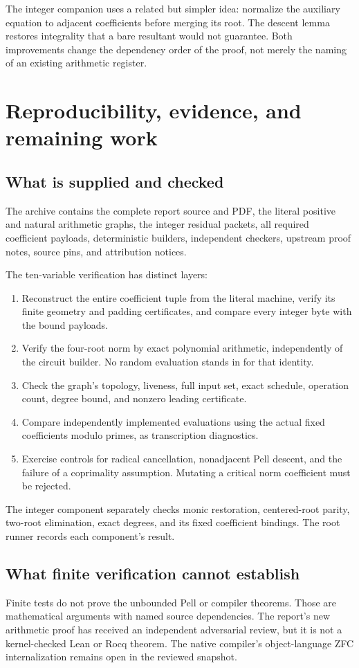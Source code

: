 \documentclass[11pt]{article}
\theoremstyle{remark}
\begin{document}
The integer companion uses a related but simpler idea: normalize the
auxiliary equation to adjacent coefficients before merging its root.
The descent lemma restores integrality that a bare resultant would not
guarantee. Both improvements change the dependency order of the proof,
not merely the naming of an existing arithmetic register.

\section{Reproducibility, evidence, and remaining work}

\subsection{What is supplied and checked}
The archive contains the complete report source and PDF, the literal
positive and natural arithmetic graphs, the integer residual packets,
all required coefficient payloads, deterministic builders, independent
checkers, upstream proof notes, source pins, and attribution notices.

The ten-variable verification has distinct layers:
\begin{enumerate}
\item Reconstruct the entire coefficient tuple from the literal machine,
      verify its finite geometry and padding certificates, and compare every
      integer byte with the bound payloads.
\item Verify the four-root norm by exact polynomial arithmetic, independently
      of the circuit builder. No random evaluation stands in for that identity.
\item Check the graph's topology, liveness, full input set, exact schedule,
      operation count, degree bound, and nonzero leading certificate.
\item Compare independently implemented evaluations using the actual fixed
      coefficients modulo primes, as transcription diagnostics.
\item Exercise controls for radical cancellation, nonadjacent Pell descent,
      and the failure of a coprimality assumption. Mutating a critical norm
      coefficient must be rejected.
\end{enumerate}
The integer component separately checks monic restoration, centered-root
parity, two-root elimination, exact degrees, and its fixed coefficient
bindings. The root runner records each component's result.

\subsection{What finite verification cannot establish}
Finite tests do not prove the unbounded Pell or compiler theorems. Those
are mathematical arguments with named source dependencies. The report's
new arithmetic proof has received an independent adversarial review, but
it is not a kernel-checked Lean or Rocq theorem. The native compiler's
object-language ZFC internalization remains open in the reviewed snapshot.
\end{document}
